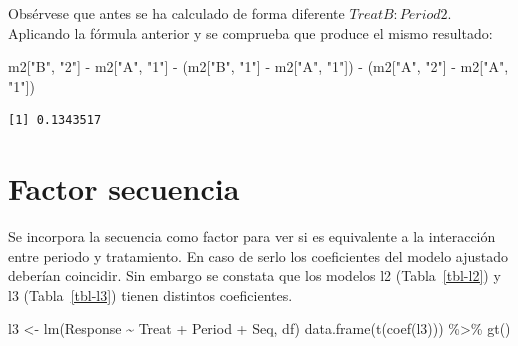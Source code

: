 \documentclass[
  12pt,
  a4paper,
  extrafontsizes,
  onecolumn,
  openright,
  table]{memoir}
\newenvironment{Shaded}{\begin{snugshade}}{\end{snugshade}}
\newcommand{\FunctionTok}[1]{\textcolor[rgb]{0.28,0.35,0.67}{#1}}
\newcommand{\NormalTok}[1]{\textcolor[rgb]{0.00,0.23,0.31}{#1}}
\newcommand{\OtherTok}[1]{\textcolor[rgb]{0.00,0.23,0.31}{#1}}
\newcommand{\SpecialCharTok}[1]{\textcolor[rgb]{0.37,0.37,0.37}{#1}}
\newcommand{\StringTok}[1]{\textcolor[rgb]{0.13,0.47,0.30}{#1}}
\begin{document}
Obsérvese que antes se ha calculado de forma diferente
\(TreatB:Period2\). Aplicando la fórmula anterior y se comprueba que
produce el mismo resultado:

\scriptsize

\begin{Shaded}
\begin{Highlighting}[]
\NormalTok{m2[}\StringTok{"B"}\NormalTok{, }\StringTok{"2"}\NormalTok{] }\SpecialCharTok{{-}}\NormalTok{ m2[}\StringTok{"A"}\NormalTok{, }\StringTok{"1"}\NormalTok{] }\SpecialCharTok{{-}}\NormalTok{ (m2[}\StringTok{"B"}\NormalTok{, }\StringTok{"1"}\NormalTok{] }\SpecialCharTok{{-}}\NormalTok{ m2[}\StringTok{"A"}\NormalTok{, }\StringTok{"1"}\NormalTok{]) }\SpecialCharTok{{-}}\NormalTok{ (m2[}\StringTok{"A"}\NormalTok{, }\StringTok{"2"}\NormalTok{] }\SpecialCharTok{{-}}\NormalTok{ m2[}\StringTok{"A"}\NormalTok{, }\StringTok{"1"}\NormalTok{])}
\end{Highlighting}
\end{Shaded}

\begin{verbatim}
[1] 0.1343517
\end{verbatim}

\normalsize

\hypertarget{factor-secuencia}{%
\section{Factor secuencia}\label{factor-secuencia}}

Se incorpora la secuencia como factor para ver si es equivalente a la
interacción entre periodo y tratamiento. En caso de serlo los
coeficientes del modelo ajustado deberían coincidir. Sin embargo se
constata que los modelos l2 (Tabla~\ref{tbl-l2}) y l3
(Tabla~\ref{tbl-l3}) tienen distintos coeficientes.

\scriptsize

\begin{Shaded}
\begin{Highlighting}[]
\NormalTok{l3 }\OtherTok{\textless{}{-}} \FunctionTok{lm}\NormalTok{(Response }\SpecialCharTok{\textasciitilde{}}\NormalTok{ Treat }\SpecialCharTok{+}\NormalTok{ Period }\SpecialCharTok{+}\NormalTok{ Seq, df)}
\FunctionTok{data.frame}\NormalTok{(}\FunctionTok{t}\NormalTok{(}\FunctionTok{coef}\NormalTok{(l3))) }\SpecialCharTok{\%\textgreater{}\%} \FunctionTok{gt}\NormalTok{()}
\end{Highlighting}
\end{Shaded}
\end{document}
